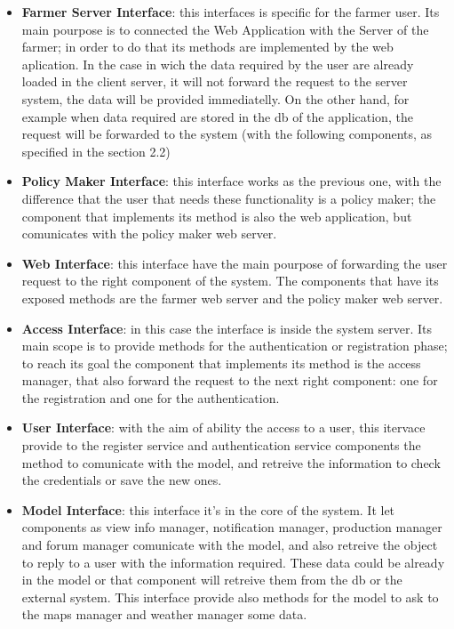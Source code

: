\begin{itemize}
    \item \textbf{Farmer Server Interface}: this interfaces is specific for the farmer user. Its main pourpose is to connected the Web Application with the Server of the farmer; in order to do that its methods are implemented by the web aplication. In the case in wich the data required by the user are already loaded in the client server, it will not forward the request to the server system, the data will be provided immediatelly. On the other hand, for example when data required are stored in the db of the application, the request will be forwarded to the system (with the following components, as specified in the section 2.2)
    \item \textbf{Policy Maker Interface}: this interface works as the previous one, with the difference that the user that needs these functionality is a policy maker; the component that implements its method is also the web application, but comunicates with the policy maker web server.
    \item \textbf{Web Interface}: this interface have the main pourpose of forwarding the user request to the right component of the system. The components that have its exposed methods are the farmer web server and the policy maker web server.   
    \item \textbf{Access Interface}: in this case the interface is inside the system server. Its main scope is to provide methods for the authentication or registration phase; to reach its goal the component that implements its method is the access manager, that also forward the request to the next right component: one for the registration and one for the authentication.
    \item \textbf{User Interface}: with the aim of ability the access to a user, this itervace provide to the register service and authentication service components the method to comunicate with the model, and retreive the information to check the credentials or save the new ones.
    \item \textbf{Model Interface}: this interface it's in the core of the system. It let components as view info manager, notification manager, production manager and forum manager comunicate with the model, and also retreive the object to reply to a user with the information required. These data could be already in the model or that component will retreive them from the db or the external system. This interface provide also methods for the model to ask to the maps manager and weather manager some data.  

\end{itemize}
